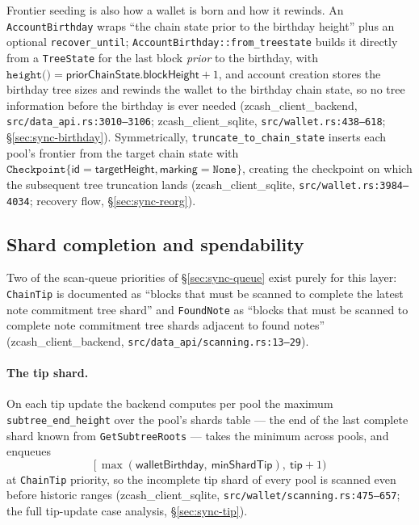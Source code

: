 \documentclass[11pt,a4paper]{article}
\theoremstyle{definition}
\begin{document}
Frontier seeding is also how a wallet is born and how it rewinds. An
\texttt{AccountBirthday} wraps ``the chain state prior to the birthday
height'' plus an optional \texttt{recover\_until};
\texttt{AccountBirthday::from\_treestate} builds it directly from a
\texttt{TreeState} for the last block \emph{prior} to the birthday, with
$\texttt{height()} = \mathsf{priorChainState}.\mathsf{blockHeight} + 1$,
and account creation stores the birthday tree sizes and rewinds the
wallet to the birthday chain state, so no tree information before the
birthday is ever needed
(\textsf{zcash\_client\_backend}, \texttt{src/data\_api.rs:3010--3106};
\textsf{zcash\_client\_sqlite}, \texttt{src/wallet.rs:438--618};
\S\ref{sec:sync-birthday}). Symmetrically,
\texttt{truncate\_to\_chain\_state} inserts each pool's frontier from
the target chain state with
$\texttt{Checkpoint}\{\mathsf{id} = \mathsf{targetHeight},
\mathsf{marking} = \texttt{None}\}$, creating the checkpoint on which the
subsequent tree truncation lands
(\textsf{zcash\_client\_sqlite}, \texttt{src/wallet.rs:3984--4034};
recovery flow, \S\ref{sec:sync-reorg}).

\subsection{Shard completion and spendability}
\label{sec:sync-tree-witness}

Two of the scan-queue priorities of \S\ref{sec:sync-queue} exist purely
for this layer: \texttt{ChainTip} is documented as ``blocks that must be
scanned to complete the latest note commitment tree shard'' and
\texttt{FoundNote} as ``blocks that must be scanned to complete note
commitment tree shards adjacent to found notes''
(\textsf{zcash\_client\_backend},
\texttt{src/data\_api/scanning.rs:13--29}).

\paragraph{The tip shard.} On each tip update the backend computes per
pool the maximum \texttt{subtree\_end\_height} over the pool's shards
table --- the end of the last complete shard known from
\texttt{GetSubtreeRoots} --- takes the minimum across pools, and
enqueues
\[
\bigl[\,\max(\mathsf{walletBirthday},\ \mathsf{minShardTip}),\
\mathsf{tip} + 1\bigr)
\]
at \texttt{ChainTip} priority, so the incomplete tip shard of every pool
is scanned even before historic ranges
(\textsf{zcash\_client\_sqlite},
\texttt{src/wallet/}\allowbreak\texttt{scanning.rs:475--657}; the full
tip-update case
analysis, \S\ref{sec:sync-tip}).
\end{document}
